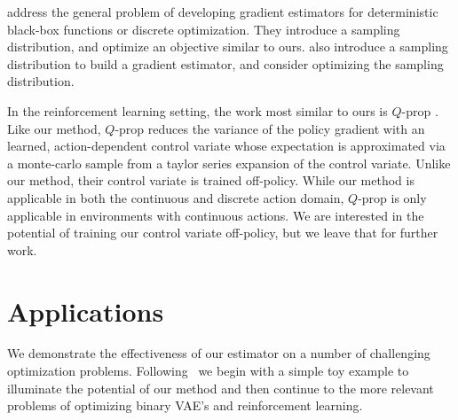 \documentclass{article}
\begin{document}


\citet{staines2012variational} address the general problem of developing gradient estimators for deterministic black-box functions or discrete optimization.
They introduce a sampling distribution, and optimize an objective similar to ours.
\citet{wierstra2014natural} also introduce a sampling distribution to build a gradient estimator, and consider optimizing the sampling distribution.

In the reinforcement learning setting, the work most similar to ours is $Q$-prop \cite{haarnoja2017reinforcement}.
Like our method, $Q$-prop reduces the variance of the policy gradient with an learned, action-dependent control variate whose expectation is approximated via a monte-carlo sample from a taylor series expansion of the control variate.
Unlike our method, their control variate is trained off-policy. While our method is applicable in both the continuous and discrete action domain, $Q$-prop is only applicable in environments with continuous actions. We are interested in the potential of training our control variate off-policy, but we leave that for further work. 





\section{Applications}
\label{Applications}
We demonstrate the effectiveness of our estimator on a number of challenging optimization problems. Following~\citet{tucker2017rebar} we begin with a simple toy example to illuminate the potential of our method and then continue to the more relevant problems of optimizing binary VAE's and reinforcement learning.
\end{document}
